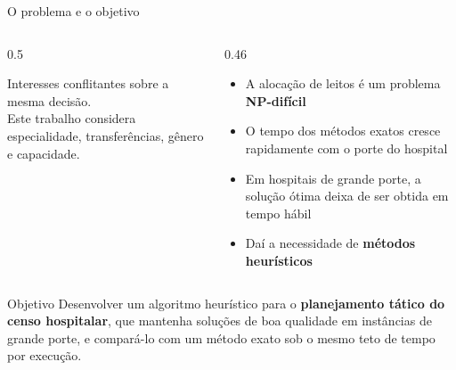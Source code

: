 \documentclass[aspectratio=169,10pt]{beamer}
\newcommand{\framerefs}{}
\newcommand{\slidecites}[1]{\gdef\framerefs{Referências: \cite{#1}}}
\gdef\framerefs{}%
\begin{document}
\begin{frame}{O problema e o objetivo}
    \slidecites{schafer2023combining, ceschia2011local, ceschia2012modeling, demeester2010hybrid, talbi2009metaheuristics}
    \begin{columns}[c]
        \begin{column}{0.5\textwidth}
            \centering

            \vspace{1mm}
            {\scriptsize Interesses conflitantes sobre a mesma decisão.\\ Este trabalho considera especialidade, transferências, gênero e capacidade.\par}
        \end{column}
        \begin{column}{0.46\textwidth}
            \begin{itemize}\setlength{\itemsep}{8pt}
                \item A alocação de leitos é um problema \textbf{NP-difícil}
                \item O tempo dos métodos exatos cresce rapidamente com o porte do hospital
                \item Em hospitais de grande porte, a solução ótima deixa de ser obtida em tempo hábil
                \item Daí a necessidade de \textbf{métodos heurísticos}
            \end{itemize}
        \end{column}
    \end{columns}

    \vspace{0.3cm}
    \begin{block}{Objetivo}
        Desenvolver um algoritmo heurístico para o \textbf{planejamento tático do censo hospitalar}, que mantenha soluções de boa qualidade em instâncias de grande porte, e compará-lo com um método exato sob o mesmo teto de tempo por execução.
    \end{block}
\end{frame}
\end{document}
